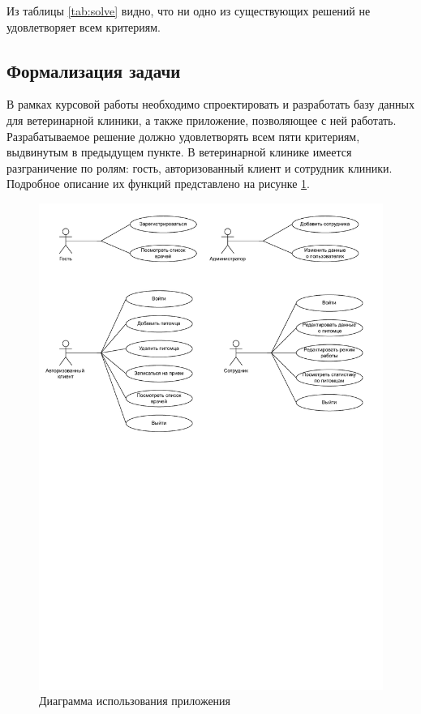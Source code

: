 Из таблицы \ref{tab:solve} видно, что ни одно из существующих решений не удовлетворяет всем критериям.

\subsection{Формализация задачи}

В рамках курсовой работы необходимо спроектировать и разработать базу данных для ветеринарной клиники, а также приложение, позволяющее с ней работать. Разрабатываемое решение должно удовлетворять всем пяти критериям, выдвинутым в предыдущем пункте. В ветеринарной клинике имеется разграничение по ролям: гость, авторизованный клиент и сотрудник клиники. Подробное описание их функций представлено на рисунке \ref{img:use-case}.

\begin{figure}[!h]
	\centering
	\includegraphics[width=140mm]{image/use-case}
	\caption{Диаграмма использования приложения}
	\label{img:use-case}
\end{figure}

